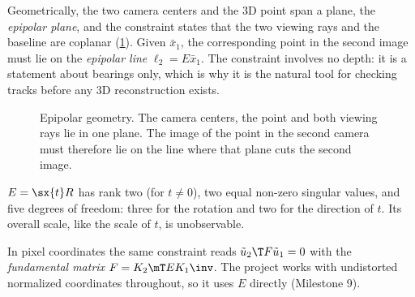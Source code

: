 Geometrically, the two camera centers and the 3D point span a plane, the \emph{epipolar plane}, and the
constraint states that the two viewing rays and the baseline are coplanar (\cref{fig:epipolar}). Given $\bar x_1$, the
corresponding point in the second image must lie on the \emph{epipolar line} $\ell_2 = E\bar x_1$. The constraint involves no
depth: it is a statement about bearings only, which is why it is the natural tool for checking tracks before any 3D
reconstruction exists.

\begin{figure}[t]
\centering
{}
\caption{Epipolar geometry. The camera centers, the point and both viewing rays lie in one plane. The image of the
point in the second camera must therefore lie on the line where that plane cuts the second image.}
\label{fig:epipolar}
\end{figure}

\begin{proposition}
$E = \sx{t}R$ has rank two (for $t \neq 0$), two equal non-zero singular values, and five degrees of freedom: three
for the rotation and two for the direction of $t$. Its overall scale, like the scale of $t$, is unobservable.
\end{proposition}

In pixel coordinates the same constraint reads $\tilde u_2\T F\tilde u_1 = 0$ with the \emph{fundamental matrix}
$F = K_2\mT EK_1\inv$. The project works with undistorted normalized coordinates throughout, so it uses $E$ directly
(Milestone 9).

